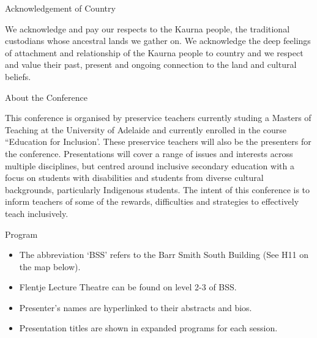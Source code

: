 \documentclass[twoside,12pt,a4paper,notitlepage]{memoir}
\newcounter{chapternonum}
\begin{document}
\pagestyle{plain}



\setcounter{tocdepth}{2}
\tableofcontents
\vfill

\clearpage{}
\vspace*{2cm}
{\Huge Acknowledgement of Country}
\vspace{2cm}

We acknowledge and pay our respects to the Kaurna people, the traditional custodians whose ancestral lands we gather on. We acknowledge the deep feelings of attachment and relationship of the Kaurna people to country and we respect and value their past, present and ongoing connection to the land and cultural beliefs.
\vfill

\clearpage{}
\vspace*{2cm}
{\Huge About the Conference}
\vspace{2cm}

This conference is organised by preservice teachers currently studing a Masters of Teaching at the University of Adelaide and currently enrolled in the course ``Education for Inclusion'. These preservice teachers will also be the presenters for the conference. Presentations will cover a range of issues and interests across multiple disciplines, but centred around inclusive secondary education with a focus on students with disabilities and students from diverse cultural backgrounds, particularly Indigenous students. The intent of this conference is to inform teachers of some of the rewards, difficulties and strategies to effectively teach inclusively. 
\vfill




%

\clearpage{}
\vspace*{2cm}
{\Huge Program}
\vspace{2cm}

\begin{itemize}
	\item The abbreviation `BSS' refers to the Barr Smith South Building (See H11 on the map below).
	\item Flentje Lecture Theatre can be found on level 2-3 of BSS.
	\item Presenter's names are hyperlinked to their abstracts and bios.
	\item Presentation titles are shown in expanded programs for each session.
\end{itemize}
\end{document}
